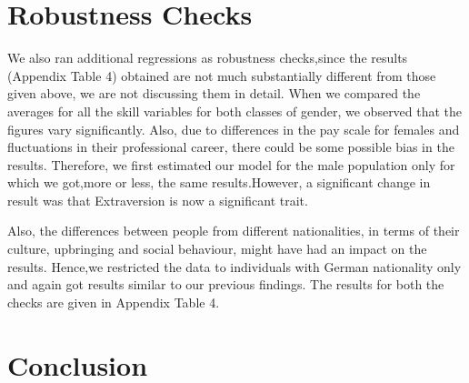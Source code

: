 \documentclass[11pt, a4paper, leqno]{article}
\begin{document}
\section*{Robustness Checks}

We also ran additional regressions as robustness checks,since the results (Appendix Table 4) obtained are not much substantially different from those given above, we are not discussing them in detail. When we compared the averages for all the skill variables for both classes of gender, we observed that the figures vary significantly.  Also, due to differences in the pay scale for females and fluctuations in their professional career, there could be some possible bias in the results. Therefore, we first estimated our model for the male population only for which we got,more or less, the same results.However, a significant change in result was that Extraversion is now a significant trait.   \par
Also, the differences between people from different nationalities, in terms of their culture, upbringing and social behaviour, might have had an impact on the results. Hence,we restricted the data to individuals with German nationality only and again got results similar to our previous findings. 
The results for both the checks are given in Appendix Table 4. 

\section*{Conclusion}
\end{document}
